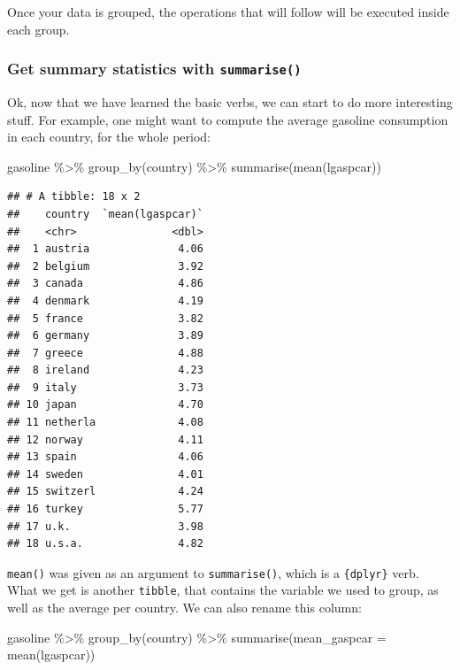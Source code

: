 \documentclass[
]{article}
\newenvironment{Shaded}{\begin{snugshade}}{\end{snugshade}}
\newcommand{\AttributeTok}[1]{\textcolor[rgb]{0.77,0.63,0.00}{#1}}
\newcommand{\FunctionTok}[1]{\textcolor[rgb]{0.00,0.00,0.00}{#1}}
\newcommand{\NormalTok}[1]{#1}
\newcommand{\SpecialCharTok}[1]{\textcolor[rgb]{0.00,0.00,0.00}{#1}}
\begin{document}
Once your data is grouped, the operations that will follow will be executed inside each group.

\hypertarget{get-summary-statistics-with-summarise}{%
\subsubsection{\texorpdfstring{Get summary statistics with \texttt{summarise()}}{Get summary statistics with summarise()}}\label{get-summary-statistics-with-summarise}}

Ok, now that we have learned the basic verbs, we can start to do more interesting stuff. For
example, one might want to compute the average gasoline consumption in each country, for
the whole period:

\begin{Shaded}
\begin{Highlighting}[]
\NormalTok{gasoline }\SpecialCharTok{\%\textgreater{}\%}
  \FunctionTok{group\_by}\NormalTok{(country) }\SpecialCharTok{\%\textgreater{}\%}
  \FunctionTok{summarise}\NormalTok{(}\FunctionTok{mean}\NormalTok{(lgaspcar))}
\end{Highlighting}
\end{Shaded}

\begin{verbatim}
## # A tibble: 18 x 2
##    country  `mean(lgaspcar)`
##    <chr>               <dbl>
##  1 austria              4.06
##  2 belgium              3.92
##  3 canada               4.86
##  4 denmark              4.19
##  5 france               3.82
##  6 germany              3.89
##  7 greece               4.88
##  8 ireland              4.23
##  9 italy                3.73
## 10 japan                4.70
## 11 netherla             4.08
## 12 norway               4.11
## 13 spain                4.06
## 14 sweden               4.01
## 15 switzerl             4.24
## 16 turkey               5.77
## 17 u.k.                 3.98
## 18 u.s.a.               4.82
\end{verbatim}

\texttt{mean()} was given as an argument to \texttt{summarise()}, which is a \texttt{\{dplyr\}} verb. What we get is
another \texttt{tibble}, that contains the variable we used to group, as well as the average per country.
We can also rename this column:

\begin{Shaded}
\begin{Highlighting}[]
\NormalTok{gasoline }\SpecialCharTok{\%\textgreater{}\%}
  \FunctionTok{group\_by}\NormalTok{(country) }\SpecialCharTok{\%\textgreater{}\%}
  \FunctionTok{summarise}\NormalTok{(}\AttributeTok{mean\_gaspcar =} \FunctionTok{mean}\NormalTok{(lgaspcar))}
\end{Highlighting}
\end{Shaded}
\end{document}
